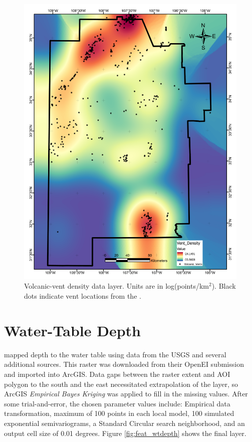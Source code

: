 \begin{figure}[H]
\centering
\includegraphics[width=0.75\linewidth]{templates/images/Figure-VentDensity.pdf}
\caption[Volcanic-vent data layer]{Volcanic-vent density data layer. Units are in log(points/km$^2$). Black dots indicate vent locations from the \protect\citet{nmbgmr_nmbgmr_2021}.}
\label{fig:feat_vents}
\end{figure}

\section{Water-Table Depth}\label{app:dl_wt_depth}
\citet{bielicki_hydrogeolgic_2015} mapped depth to the water table using data from the USGS and several additional sources. This raster was downloaded from their OpenEI submission \citep{kelley_geothermal_2015} and imported into ArcGIS. Data gaps between the raster extent and AOI polygon to the south and the east necessitated extrapolation of the layer, so ArcGIS \textit{Empirical Bayes Kriging} was applied to fill in the missing values. After some trial-and-error, the chosen parameter values include: Empirical data transformation, maximum of 100 points in each local model, 100 simulated exponential semivariograms, a Standard Circular search neighborhood, and an output cell size of 0.01 degrees. Figure \ref{fig:feat_wtdepth} shows the final layer.

